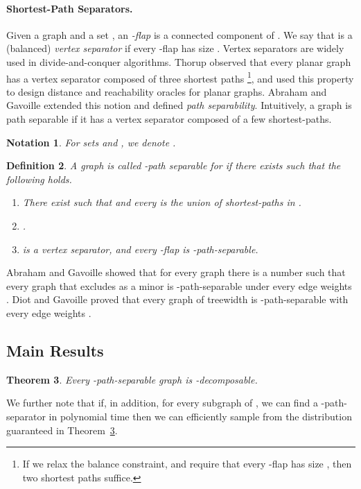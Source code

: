 \documentclass[11pt,fleqn]{article}
\newtheorem{theorem}{Theorem}[section]
\newtheorem{definition}[theorem]{Definition}
\newtheorem{notation}[theorem]{Notation}
\begin{document}
\paragraph{Shortest-Path Separators.} 
Given a graph  and a set , an {\em -flap} is a connected component of . We say that  is a (balanced) {\em vertex separator} if every -flap  has size . Vertex separators are widely used in divide-and-conquer algorithms. Thorup \cite{T04} observed that every planar graph has a vertex separator composed of three shortest paths \footnote{If we relax the balance constraint, and require that every -flap  has size , then two shortest paths suffice.}, and used this property to design distance and reachability oracles for planar graphs.
Abraham and Gavoille \cite{AG06} extended this notion and defined {\em path separability}. Intuitively, a graph is path separable if it has a vertex separator composed of a few shortest-paths.
\begin{notation}
For sets  and , we denote . 
\end{notation}

\begin{definition}\label{def:pathDec}\cite{AG06}
A graph  is called {\em -path separable} for  if there exists  
such that the following holds.
\begin{enumerate}
	\item There exist  such that  and every  is the union of  shortest-paths in .
	\item .
	\item  is a vertex separator, and every -flap is -path-separable.
\end{enumerate}
\end{definition}
Abraham and Gavoille showed that for every graph  there is a number  such that every graph  that excludes  as a minor is -path-separable under every edge weights .
Diot and Gavoille \cite{DG10} proved that every graph of treewidth  is -path-separable with every edge weights .

\subsection{Main Results}
\begin{theorem} \label{th:sepToDec}
Every -path-separable graph  is -decomposable.
\end{theorem}
We further note that if, in addition, for every subgraph  of , we can find a -path-separator in polynomial time then we can efficiently sample from the distribution guaranteed in Theorem~\ref{th:sepToDec}.
\end{document}

